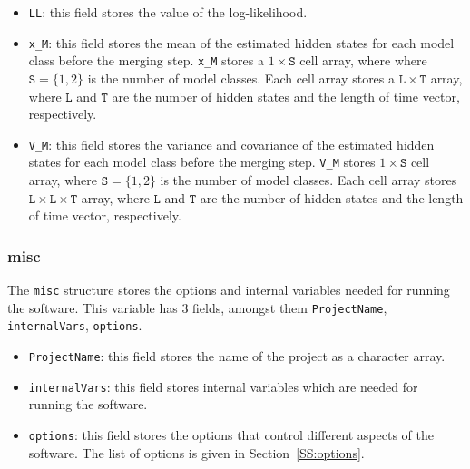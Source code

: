 {\begin{itemize}
\item \lstinline[basicstyle = \mlttfamily \small ]!LL!: this field stores the value of the log-likelihood.
\item \lstinline[basicstyle = \mlttfamily \small ]!x_M!: this field stores the mean of the estimated hidden states for each model class before the merging step. \lstinline[basicstyle = \mlttfamily \small ]!x_M! stores a $1 \times \mathtt{S}$ cell array, where  where $\mathtt{S} = \{1,2 \}$ is the number of model classes. Each cell array stores a $\mathtt{L} \times \mathtt{T}$ array, where $\mathtt{L}$ and $\mathtt{T}$ are the number of hidden states and the length of time vector, respectively.
\item \lstinline[basicstyle = \mlttfamily \small ]!V_M!: this field stores the variance and covariance of the estimated hidden states for each model class before the merging step. \lstinline[basicstyle = \mlttfamily \small ]!V_M! stores $1 \times \mathtt{S}$ cell array, where $\mathtt{S} = \{1,2 \}$ is the number of model classes. Each cell array stores $\mathtt{L} \times  \mathtt{L} \times \mathtt{T}$ array, where $\mathtt{L}$ and $\mathtt{T}$ are the number of hidden states and the length of time vector, respectively.
\end{itemize}

\subsubsection{misc}
The \lstinline[basicstyle = \mlttfamily \small ]!misc! structure stores the options and internal variables needed for running the software.
This variable has 3 fields, amongst them \lstinline[basicstyle = \mlttfamily \small ]!ProjectName!, \lstinline[basicstyle = \mlttfamily \small ]!internalVars!, \lstinline[basicstyle = \mlttfamily \small ]!options!.

\begin{itemize}
\item \lstinline[basicstyle = \mlttfamily \small ]!ProjectName!: this field stores the name of the project as a character array.
\item \lstinline[basicstyle = \mlttfamily \small ]!internalVars!: this field stores internal variables which are needed for running the software.
\item \lstinline[basicstyle = \mlttfamily \small ]!options!: this field stores the options that control different aspects of the software. The list of options is given in Section~\ref{SS:options}.
\end{itemize}


}

